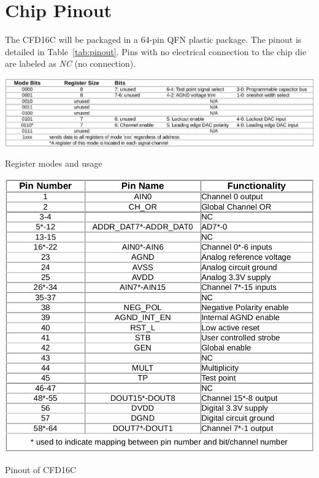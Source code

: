 \documentclass[12pt,oneside,final]{siuethesis}
\theoremstyle{definition}
\begin{document}
\section{Chip Pinout}
\par The CFD16C will be packaged in a 64-pin QFN plastic package. The pinout is detailed in Table~\ref{tab:pinout}. Pins with no electrical connection to the chip die are labeled as \emph{NC} (no connection).

\begin{table}[htbp!]
\centering
\includegraphics[scale=.3,keepaspectratio=true]{../data/modes.png} 
\caption{Register modes and usage}
\label{tab:modes}
\end{table}

\begin{table}[htbp!]
 \centering
 \includegraphics[scale=.35,keepaspectratio=true]{./ch2_figures/pinout.png}
 \caption{Pinout of CFD16C}
 \label{tab:pinout}
\end{table}


\end{document}
